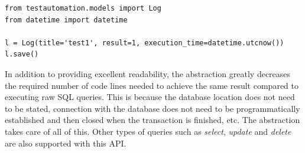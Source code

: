 \vspace{4mm}
\begin{lstlisting}[caption=Database Communication Using Abstraction API, label={listing.db}]
from testautomation.models import Log
from datetime import datetime
 
l = Log(title='test1', result=1, execution_time=datetime.utcnow())
l.save()
\end{lstlisting}

In addition to providing excellent readability, the abstraction greatly decreases the required number of code lines needed to achieve the same result compared to executing raw SQL queries. This is because the database location does not need to be stated, connection with the database does not need to be programmatically established and then closed when the transaction is finished, etc. The abstraction takes care of all of this. Other types of queries such as \emph{select}, \emph{update} and \emph{delete} are also supported with this API.

